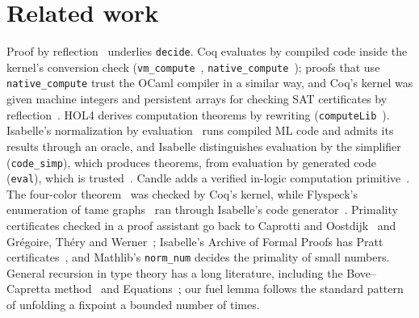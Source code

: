 \documentclass[11pt]{article}
\begin{document}
\section{Related work}\label{sec:related}
Proof by reflection~\cite{boutin} underlies \texttt{decide}. Coq evaluates by compiled code inside
the kernel's conversion check (\texttt{vm\_compute}~\cite{gregoire-leroy},
\texttt{native\_compute}~\cite{boespflug}); proofs that use \texttt{native\_compute} trust the
OCaml compiler in a similar way, and Coq's kernel was given machine integers and persistent arrays
for checking SAT certificates by reflection~\cite{armand10}. HOL4 derives computation theorems by
rewriting (\texttt{computeLib}~\cite{barras}). Isabelle's normalization by evaluation~\cite{aehlig}
runs compiled ML code and admits its results through an oracle, and Isabelle distinguishes
evaluation by the simplifier (\texttt{code\_simp}), which produces theorems, from evaluation by
generated code (\texttt{eval}), which is trusted~\cite{haftmann,codegen}. Candle adds a verified
in-logic computation primitive~\cite{candle}. The four-color theorem~\cite{gonthier} was checked
by Coq's kernel, while Flyspeck's enumeration of tame graphs~\cite{tame} ran through Isabelle's
code generator~\cite{flyspeck}. Primality certificates checked in a proof assistant go back to
Caprotti and Oostdijk~\cite{caprotti} and Gr\'egoire, Th\'ery and Werner~\cite{pocklington};
Isabelle's Archive of Formal Proofs has Pratt certificates~\cite{afppratt}, and Mathlib's
\texttt{norm\_num} decides the primality of small numbers. General recursion in type theory has a
long literature, including the Bove--Capretta method~\cite{bove} and Equations~\cite{equations};
our fuel lemma follows the standard pattern of unfolding a fixpoint a bounded number of times.
\end{document}
